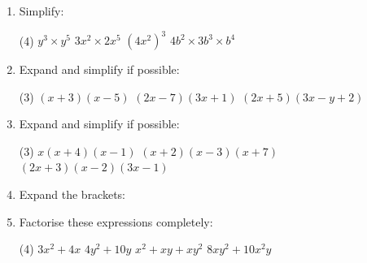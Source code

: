 \documentclass[fleqn, twoside]{article}
\begin{document}
\begin{enumerate}
    \item Simplify:
        \begin{tasks}(4) %
            \task $y^3 \times y^5$                    %
            \task $3x^2 \times 2x^5$                  %
            \task $(4x^2)^3$                          %
            \task $4b^2 \times 3b^3 \times b^4$       %
        \end{tasks}
        
    \item Expand and simplify if possible:
        \begin{tasks}(3) %
            \task $(x+3)(x-5)$
            \task $(2x-7)(3x+1)$
            \task $(2x+5)(3x-y+2)$
        \end{tasks}
        
    \item Expand and simplify if possible:
        \begin{tasks}(3) %
            \task $x(x+4)(x-1)$                       %
            \task $(x+2)(x-3)(x+7)$                   %
            \task $(2x+3)(x-2)(3x-1)$                 %
        \end{tasks}
        
    \item Expand the brackets: \vspace{3mm}\\\hspace*{1mm} %
        
    \item Factorise these expressions completely:
        \begin{tasks}(4) %
            \task $3x^2+4x$             %
            \task $4y^2+10y$            %
            \task $x^2+xy+xy^2$         %
            \task $8xy^2+10x^2y$        %
        \end{tasks}
        

\end{enumerate}
\end{document}
